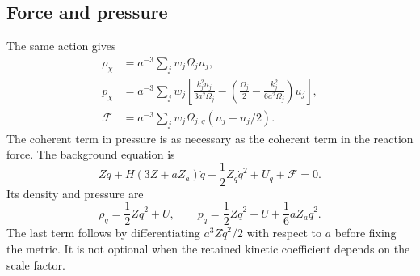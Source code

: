 \documentclass[11pt]{article}
\theoremstyle{definition}\newtheorem{definition}[theorem]{Definition}
\begin{document}
\subsection{Force and pressure}
The same action gives
\begin{align}
\rho_\chi&=a^{-3}\sum_jw_j\Omega_jn_j,\label{eq:rhomode}\\
p_\chi&=a^{-3}\sum_jw_j\left[\frac{k_j^2n_j}{3a^2\Omega_j}
-\left(\frac{\Omega_j}{2}-\frac{k_j^2}{6a^2\Omega_j}\right)u_j\right],\label{eq:pmode}\\
\mathcal F&=a^{-3}\sum_jw_j\Omega_{j,q}(n_j+u_j/2).\label{eq:force}
\end{align}
The coherent term in pressure is as necessary as the coherent term in the reaction force. The background equation is
\begin{equation}
Z\ddot q+H(3Z+aZ_a)\dot q+\frac12Z_q\dot q^2+U_q+\mathcal F=0.\label{eq:background}
\end{equation}
Its density and pressure are
\begin{equation}
\rho_q=\frac12Z\dot q^2+U,\qquad
p_q=\frac12Z\dot q^2-U+\frac16aZ_a\dot q^2.\label{eq:scalarstress}
\end{equation}
The last term follows by differentiating $a^3Z\dot q^2/2$ with respect to $a$ before fixing the metric. It is not optional when the retained kinetic coefficient depends on the scale factor.
\end{document}
